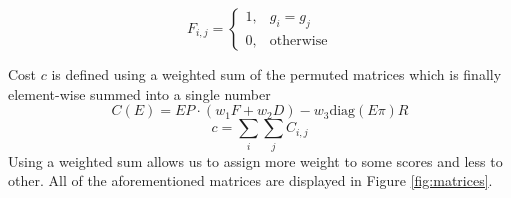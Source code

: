 \documentclass[9pt,twocolumn,twoside]{pnas-report}
\begin{document}
{\begin{itemize}
\begin{equation}
    \end{equation}
    \begin{equation}
        F_{i,j} =
        \begin{cases}
            1, & g_i = g_j\\
            0, & \text{otherwise}
        \end{cases}
    \end{equation}
\end{itemize}
Cost $c$ is defined using a weighted sum of the permuted matrices which is finally element-wise summed into a single number
\begin{equation}
    C(E) = E P \cdot (w_1 F + w_2 D) - w_3\text{diag}(E \pi)R
\end{equation}
\begin{equation}
    c = \sum_i \sum_j C_{i,j}
\end{equation}
Using a weighted sum allows us to assign more weight to some scores and less to other.
All of the aforementioned matrices are displayed in Figure \ref{fig:matrices}.

}
\end{document}
